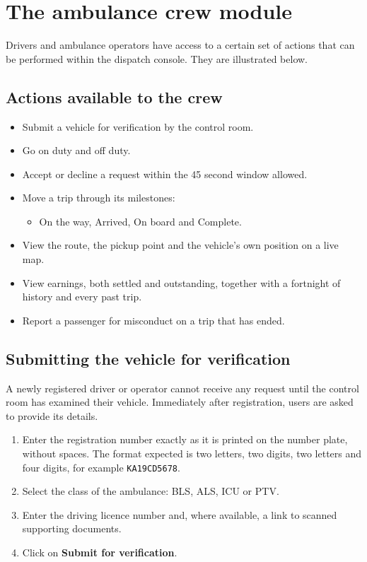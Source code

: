 \documentclass[11pt,a4paper]{article}
\begin{document}
\section{The ambulance crew module}
\label{sec:crew}

Drivers and ambulance operators have access to a certain set of actions that can
be performed within the dispatch console. They are illustrated below.

\subsection{Actions available to the crew}

\begin{itemize}
  \item Submit a vehicle for verification by the control room.
  \item Go on duty and off duty.
  \item Accept or decline a request within the 45 second window allowed.
  \item Move a trip through its milestones:
    \begin{itemize}
      \item On the way, Arrived, On board and Complete.
    \end{itemize}
  \item View the route, the pickup point and the vehicle's own position on a
        live map.
  \item View earnings, both settled and outstanding, together with a fortnight
        of history and every past trip.
  \item Report a passenger for misconduct on a trip that has ended.
\end{itemize}

\subsection{Submitting the vehicle for verification}
\label{sec:crewverify}

A newly registered driver or operator cannot receive any request until the
control room has examined their vehicle. Immediately after registration, users
are asked to provide its details.

\begin{enumerate}
  \item Enter the registration number exactly as it is printed on the number
        plate, without spaces. The format expected is two letters, two digits,
        two letters and four digits, for example \texttt{KA19CD5678}.
  \item Select the class of the ambulance: BLS, ALS, ICU or PTV.
  \item Enter the driving licence number and, where available, a link to scanned
        supporting documents.
  \item Click on \textbf{Submit for verification}.
\end{enumerate}
\end{document}
